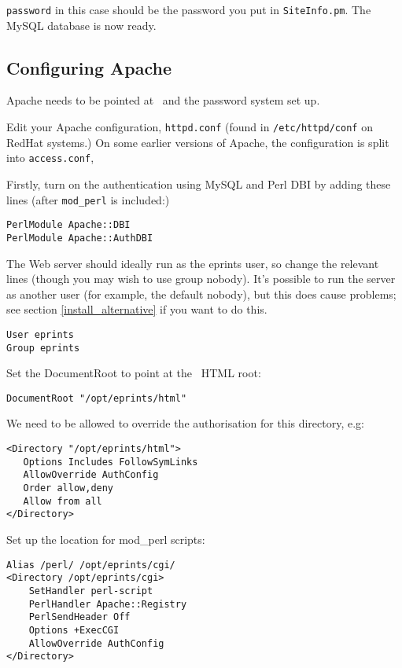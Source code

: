 {\tt password} in this case should be the password you put in {\tt SiteInfo.pm}. The MySQL database is now ready.


\subsection{Configuring Apache}

Apache needs to be pointed at \eprints\ and the password system set up.

Edit your Apache configuration, {\tt httpd.conf} (found in {\tt /etc/httpd/conf} on RedHat systems.) On some earlier versions of Apache, the configuration is split into {\tt access.conf}, {\tt 

Firstly, turn on the authentication using MySQL and Perl DBI by adding these lines (after {\tt mod\_perl} is included:)

\begin{verbatim}
PerlModule Apache::DBI
PerlModule Apache::AuthDBI
\end{verbatim}

The Web server should ideally run as the eprints user, so change the relevant lines (though you may wish to use group nobody). It's possible to run the server as another user (for example, the default nobody), but this does cause problems; see section \ref{install_alternative} if you want to do this.

\begin{verbatim}
User eprints
Group eprints
\end{verbatim}

Set the DocumentRoot to point at the \eprints\ HTML root:

\begin{verbatim}
DocumentRoot "/opt/eprints/html"
\end{verbatim}

We need to be allowed to override the authorisation for this directory, e.g:

\begin{verbatim}
<Directory "/opt/eprints/html">
   Options Includes FollowSymLinks
   AllowOverride AuthConfig
   Order allow,deny
   Allow from all
</Directory>
\end{verbatim}

Set up the location for mod\_perl scripts:

\begin{verbatim}
Alias /perl/ /opt/eprints/cgi/
<Directory /opt/eprints/cgi>
    SetHandler perl-script
    PerlHandler Apache::Registry
    PerlSendHeader Off
    Options +ExecCGI
    AllowOverride AuthConfig
</Directory>
\end{verbatim}

}
